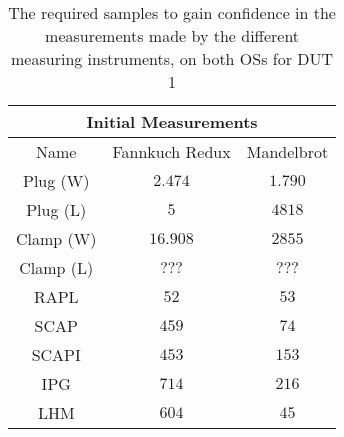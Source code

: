 \begin{table}[H]
    \centering
    \begin{tabular}{|| c | c | c ||}
    \hline
    \multicolumn{3}{||c||}{Initial Measurements} \\ [0.5ex] \hline\hline
    Name & Fannkuch Redux & Mandelbrot \\\hline
    Plug (W) & $2.474$ & $1.790$ \\
    Plug (L) & $5$ & $4818$ \\
    Clamp (W) & $16.908$ & $2855$ \\
    Clamp (L) & $???$ & $???$ \\
    RAPL & $52$ & $53$ \\
    SCAP & $459$ & $74$ \\
    SCAPI & $453$ & $153$ \\
    IPG & $714$ & $216$ \\
    LHM & $604$ & $45$ \\\hline
    \end{tabular}
    \caption{The required samples to gain confidence in the measurements made by the different measuring instruments, on both OSs for DUT 1}
    \label{tab:initial-measurements-exp-2-dut-1}
\end{table}
